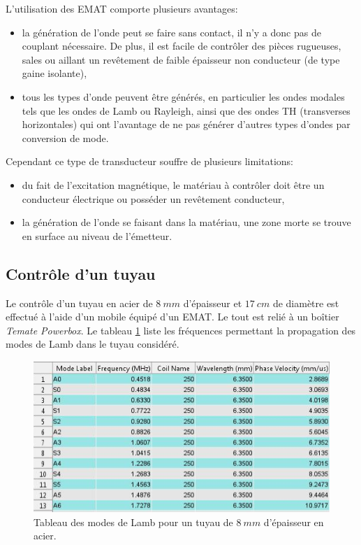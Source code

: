 \documentclass[twoside]{article}
\begin{document}
\begin{multicols}{2}
\bigskip
L'utilisation des EMAT comporte plusieurs avantages:
\begin{itemize}
\item la génération de l'onde peut se faire sans contact, il n'y a donc pas de couplant nécessaire. De plus, il est facile de contrôler des pièces rugueuses, sales ou aillant un revêtement de faible épaisseur non conducteur (de type gaine isolante),
\item tous les types d'onde peuvent être générés, en particulier les ondes modales tels que les ondes de Lamb ou Rayleigh, ainsi que des ondes TH (transverses horizontales) qui ont l'avantage de ne pas générer d'autres types d'ondes par conversion de mode. 
\end{itemize} 

Cependant ce type de transducteur souffre de plusieurs limitations:
\begin{itemize}
\item du fait de l'excitation magnétique, le matériau à contrôler doit être un conducteur électrique ou posséder un revêtement conducteur,
\item la génération de l'onde se faisant dans la matériau, une zone morte se trouve en surface au niveau de l'émetteur.
\end{itemize}

\subsection{Contrôle d'un tuyau}
Le contrôle d'un tuyau en acier de $8~mm$ d'épaisseur et $17~cm$ de diamètre est effectué à l'aide d'un mobile équipé d'un EMAT. Le tout est relié à un boîtier \emph{Temate Powerbox}. Le tableau \ref{tab1} liste les fréquences permettant la propagation des modes de Lamb dans le tuyau considéré. 

\begin{figure}[H]
\centering
\includegraphics[scale=0.6]{./images/table_dispersion.jpg}
\caption{\label{tab1} Tableau des modes de Lamb pour un tuyau de $8~mm$ d'épaisseur en acier.}
\end{figure}


\end{multicols}
\end{document}
